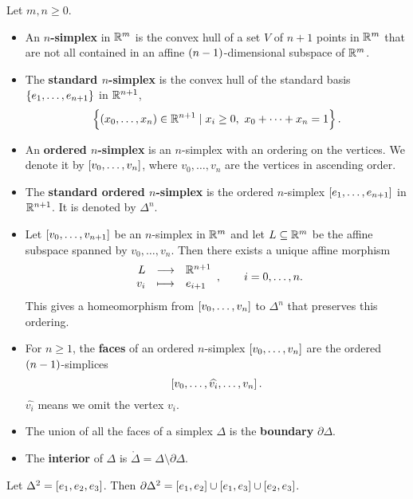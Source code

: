 \begin{definition*}
Let $ m, n \ge 0 $.
\begin{itemize}
\item An \textbf{$ n $-simplex} in $ \mathbb{R}^m $ is the convex hull of a set $ V $ of $ n + 1 $ points in $ \mathbb{R}^m $ that are not all contained in an affine $ \br{n - 1} $-dimensional subspace of $ \mathbb{R}^m $.
\item The \textbf{standard $ n $-simplex} is the convex hull of the standard basis $ \cbr{e_1, \dots, e_{n + 1}} $ in $ \mathbb{R}^{n + 1} $,
$$ \cbr{\br{x_0, \dots, x_n} \in \R^{n + 1} \mid x_i \ge 0, \ x_0 + \dots + x_n = 1}. $$
\item An \textbf{ordered $ n $-simplex} is an $ n $-simplex with an ordering on the vertices. We denote it by $ \sbr{v_0, \dots, v_n} $, where $ v_0, \dots, v_n $ are the vertices in ascending order.
\item The \textbf{standard ordered $ n $-simplex} is the ordered $ n $-simplex $ \sbr{e_1, \dots, e_{n + 1}} $ in $ \mathbb{R}^{n + 1} $. It is denoted by $ \Delta^n $.
\item Let $ \sbr{v_0, \dots, v_{n + 1}} $ be an $ n $-simplex in $ \mathbb{R}^m $ and let $ L \subseteq \mathbb{R}^m $ be the affine subspace spanned by $ v_0, \dots, v_n $. Then there exists a unique affine morphism
$$ \function{L}{\R^{n + 1}}{v_i}{e_{i + 1}}, \qquad i = 0, \dots, n. $$
This gives a homeomorphism from $ \sbr{v_0, \dots, v_n} $ to $ \Delta^n $ that preserves this ordering.
\item For $ n \ge 1 $, the \textbf{faces} of an ordered $ n $-simplex $ \sbr{v_0, \dots, v_n} $ are the ordered $ \br{n - 1} $-simplices
$$ \sbr{v_0, \dots, \widehat{v_i}, \dots, v_n}. $$
$ \widehat{v_i} $ means we omit the vertex $ v_i $.
\item The union of all the faces of a simplex $ \Delta $ is the \textbf{boundary} $ \partial\Delta $.
\item The \textbf{interior} of $ \Delta $ is $ \mathring{\Delta} = \Delta \setminus \partial\Delta $.
\end{itemize}
\end{definition*}

\begin{example*}
Let $ \Delta^2 = \sbr{e_1, e_2, e_3} $. Then $ \partial\Delta^2 = \sbr{e_1, e_2} \cup \sbr{e_1, e_3} \cup \sbr{e_2, e_3} $.
\end{example*}


